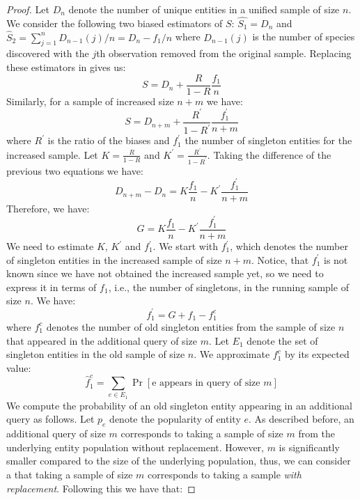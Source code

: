 \begin{proof}
Let $D_n$ denote the number of unique entities in a unified sample of size $n$. We consider the following two biased estimators of $S$: $\hat{S_1} = D_n$ and $\hat{S}_2 = \sum_{j=1}^n D_{n-1}(j)/n = D_n - f_1/n$ where $D_{n-1}(j)$ is the number of species discovered with the $j$th observation removed from the original sample. Replacing these estimators in  gives us:
\begin{equation}
S = D_n +\frac{R}{1-R}\frac{f_1}{n}
\end{equation}
Similarly, for a sample of increased size $n+m$ we have:
\begin{equation}
S = D_{n+m} +\frac{R^{\prime}}{1-R^{\prime}}\frac{f^{\prime}_1}{n+m}
\end{equation}
where $R^{\prime}$ is the ratio of the biases and $f^{\prime}_1$ the number of singleton entities for the increased sample. Let $K = \frac{R}{1-R}$ and $K^{\prime} = \frac{R^{\prime}}{1-R^{\prime}}$. Taking the difference of the previous two equations we have:
\begin{equation}
D_{n+m} - D_{n} = K\frac{f_1}{n} - K^{\prime}\frac{f^{\prime}_1}{n+m}
\end{equation}
Therefore, we have:
\begin{equation}
\label{eq:new}
G = K\frac{f_1}{n} - K^{\prime}\frac{f^{\prime}_1}{n+m}
\end{equation}
We need to estimate $K$, $K^{\prime}$ and $f^{\prime}_1$. We start with $f^{\prime}_1$, which denotes the number of singleton entities in the increased sample of size $n+m$. Notice, that $f^{\prime}_1$ is not known since we have not obtained the increased sample yet, so we need to express it in terms of $f_1$, i.e., the number of singletons, in the running sample of size $n$. We have:
\begin{equation}
f^{\prime}_1 = G + f_1 - f_1^c
\end{equation}
where $f_1^c$ denotes the number of old singleton entities from the sample of size $n$ that appeared in the additional query of size $m$. Let $E_1$ denote the set of singleton entities in the old sample of size $n$. We approximate $f_1^c$ by its expected value:
\begin{equation}
\hat{f}_1^c = \sum_{e \in E_1} \Pr[\mbox{e appears in query of size $m$}]
\end{equation}
We compute the probability of an old singleton entity appearing in an additional query as follows. Let $p_e$ denote the popularity of entity $e$. As described before, an additional query of size $m$ corresponds to taking a sample of size $m$ from the underlying entity population without replacement. However, $m$ is significantly smaller compared to the size of the underlying population, thus, we can consider a that taking a sample of size $m$ corresponds to taking a sample {\em with replacement}. Following this we have that:

\end{proof}
